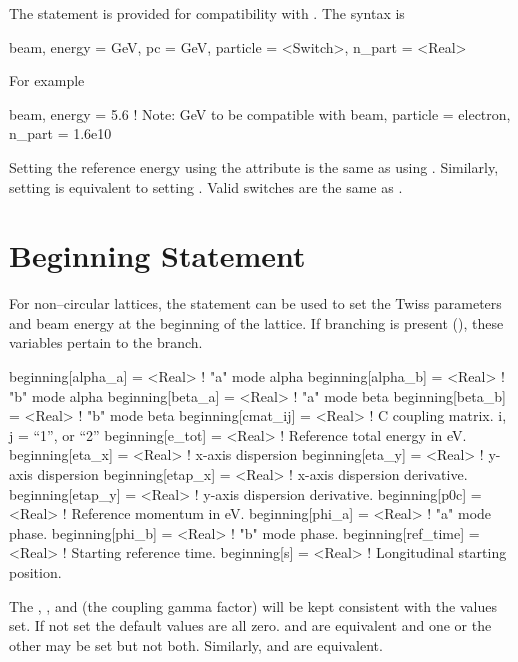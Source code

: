 The  statement is provided for compatibility with \mad. The syntax is
\begin{example}
  beam, energy = GeV, pc = GeV, particle = <Switch>, n_part = <Real>
\end{example}
For example
\begin{example}
  beam, energy = 5.6  ! Note: GeV to be compatible with \mad
  beam, particle = electron, n_part = 1.6e10
\end{example}
Setting the reference energy using the  attribute is the
same as using . Similarly, setting  is
equivalent to setting . Valid  switches
are the same as .

\section{Beginning Statement}
\label{s:beginning}

For non--circular lattices, the  statement can be used to
set the Twiss parameters and beam energy at the beginning of the lattice.
If branching is present (), these variables
pertain to the  branch. \begin{example}
  beginning[alpha_a]  = <Real>  ! "a" mode alpha
  beginning[alpha_b]  = <Real>  ! "b" mode alpha
  beginning[beta_a]   = <Real>  ! "a" mode beta
  beginning[beta_b]   = <Real>  ! "b" mode beta
  beginning[cmat_ij]  = <Real>  ! C coupling matrix. i, j = {``1'', or ``2''} 
  beginning[e_tot]    = <Real>  ! Reference total energy in eV.
  beginning[eta_x]    = <Real>  ! x-axis dispersion
  beginning[eta_y]    = <Real>  ! y-axis dispersion
  beginning[etap_x]   = <Real>  ! x-axis dispersion derivative.
  beginning[etap_y]   = <Real>  ! y-axis dispersion derivative.
  beginning[p0c]      = <Real>  ! Reference momentum in eV.
  beginning[phi_a]    = <Real>  ! "a" mode phase.
  beginning[phi_b]    = <Real>  ! "b" mode phase.
  beginning[ref_time] = <Real>  ! Starting reference time.
  beginning[s]        = <Real>  ! Longitudinal starting position.
\end{example}
The , , and  (the coupling gamma
factor) will be kept consistent with the values set. If not set the
default values are all zero.   and
 are equivalent and one or the other may be
set but not both. Similarly,  and
 are equivalent.


